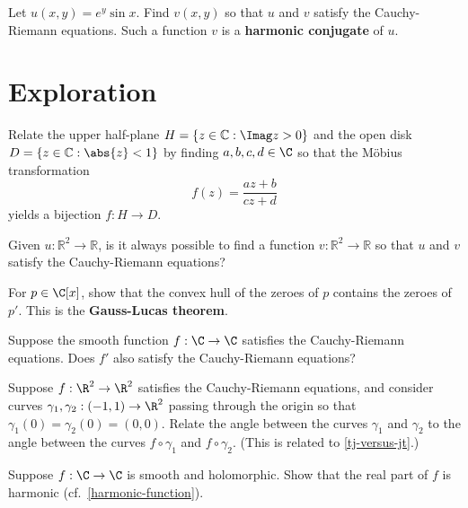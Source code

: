 \documentclass{homework}
\begin{document}
\begin{problem}\label{harmonic-conjugate}Let $u(x,y) = e^y \sin x$.  Find $v(x,y)$ so that $u$ and $v$
  satisfy the Cauchy-Riemann equations.  Such a function $v$ is a
  \textbf{harmonic conjugate} of $u$.
\end{problem}

\section{Exploration}

\begin{problem}\label{cayley-transform}Relate the upper half-plane
  $H = \{ z \in \mathbb{C} : \Imag z > 0 \}$ and the open disk
  $D = \{ z \in \mathbb{C} : \abs{z} < 1 \}$ by finding $a,b,c,d \in \C$ so that the M\"obius transformation
  \[f(z) = \frac{az + b}{cz + d}\] yields a bijection $f : H \to D$.
\end{problem}

\begin{problem}\label{harmonic-necessary}Given $u : \mathbb{R}^2 \to \mathbb{R}$, is it always possible to
  find a function $v : \mathbb{R}^2 \to \mathbb{R}$ so that $u$ and
  $v$ satisfy the Cauchy-Riemann equations?
\end{problem}

\begin{problem}\label{gauss-lucas}For $p \in \C[x]$, show that the convex hull of the zeroes of $p$
  contains the zeroes of $p'$.  This is the \textbf{Gauss-Lucas
    theorem}.
\end{problem}

\begin{problem}
  Suppose the smooth function $f : \C \to \C$ satisfies the
  Cauchy-Riemann equations.  Does $f'$ also satisfy the Cauchy-Riemann
  equations?
\end{problem}

\begin{problem}
  Suppose $f : \R^2 \to \R^2$ satisfies the Cauchy-Riemann equations,
  and consider curves $\gamma_1, \gamma_2 : (-1,1) \to \R^2$ passing
  through the origin so that $\gamma_1(0) = \gamma_2(0) = (0,0)$.
  Relate the angle between the curves $\gamma_1$ and $\gamma_2$ to the
  angle between the curves $f \circ \gamma_1$ and $f \circ \gamma_2$.
  (This is related to \ref{tj-versus-jt}.)
\end{problem}

\begin{problem}
  Suppose $f : \C \to \C$ is smooth and holomorphic.  Show that the
  real part of $f$ is harmonic (cf.~\ref{harmonic-function}).
\end{problem}
\end{document}

